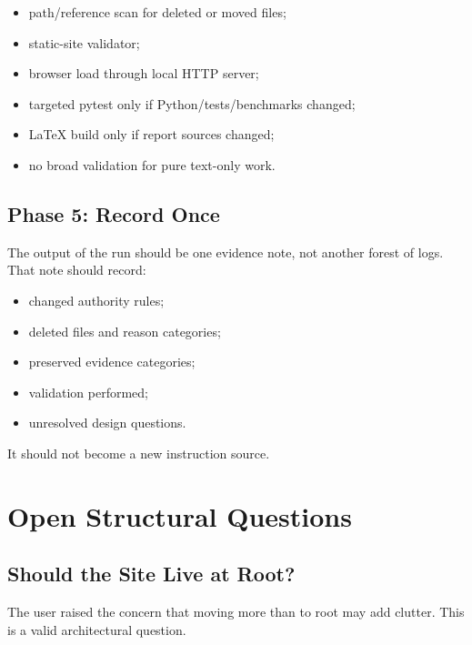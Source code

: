 \documentclass[a4paper,11pt,openany]{report}
\newcommand{\safePath}[1]{\texttt{\detokenize{#1}}}
\begin{document}
\begin{itemize}
  \item path/reference scan for deleted or moved files;
  \item static-site validator;
  \item browser load through local HTTP server;
  \item targeted pytest only if Python/tests/benchmarks changed;
  \item LaTeX build only if report sources changed;
  \item no broad validation for pure text-only work.
\end{itemize}

\section{Phase 5: Record Once}

The output of the run should be one evidence note, not another forest of logs.
That note should record:

\begin{itemize}
  \item changed authority rules;
  \item deleted files and reason categories;
  \item preserved evidence categories;
  \item validation performed;
  \item unresolved design questions.
\end{itemize}

It should not become a new instruction source.

\chapter{Open Structural Questions}
\label{ch:open-questions}


\section{Should the Site Live at Root?}

The user raised the concern that moving more than \safePath{index.html} to root
may add clutter. This is a valid architectural question.
\end{document}
